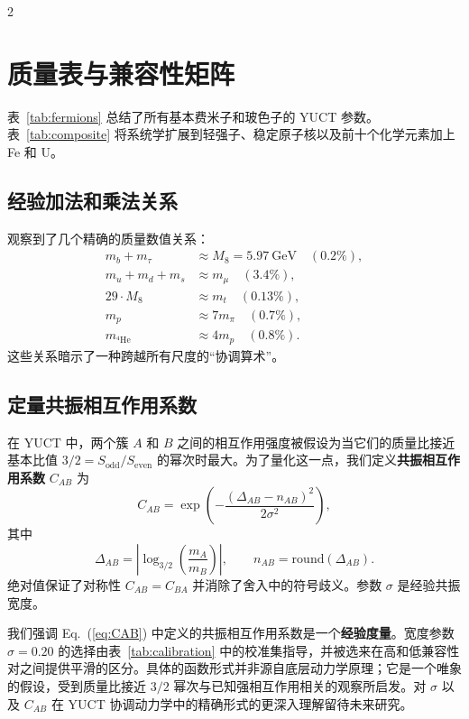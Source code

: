 \documentclass[11pt,a4paper]{article}
\begin{document}
	\begin{multicols}{2}
		
		\section{质量表与兼容性矩阵}
		\label{sec:tables}
		
		表~\ref{tab:fermions} 总结了所有基本费米子和玻色子的 YUCT 参数。表~\ref{tab:composite} 将系统学扩展到轻强子、稳定原子核以及前十个化学元素加上 Fe 和 U。
		
		\subsection{经验加法和乘法关系}
		
		观察到了几个精确的质量数值关系：
		\begin{align*}
			m_b + m_\tau &\approx M_8 = 5.97\ \text{GeV} \quad (0.2\%),\\
			m_u + m_d + m_s &\approx m_\mu \quad (3.4\%),\\
			29 \cdot M_8 &\approx m_t \quad (0.13\%),\\
			m_p &\approx 7 m_\pi \quad (0.7\%),\\
			m_{^4\mathrm{He}} &\approx 4 m_p \quad (0.8\%).
		\end{align*}
		这些关系暗示了一种跨越所有尺度的“协调算术”。
		
		\subsection{定量共振相互作用系数}
		
		在 YUCT 中，两个簇 \(A\) 和 \(B\) 之间的相互作用强度被假设为当它们的质量比接近基本比值 \(3/2 = S_{\mathrm{odd}}/S_{\mathrm{even}}\) 的幂次时最大。为了量化这一点，我们定义\textbf{共振相互作用系数} \(C_{AB}\) 为
		\begin{equation}
			C_{AB} = \exp\left( - \frac{(\Delta_{AB} - n_{AB})^2}{2\sigma^2} \right),
			\label{eq:CAB}
		\end{equation}
		其中
		\[
		\Delta_{AB} = \left| \log_{3/2}\left( \frac{m_A}{m_B} \right) \right|, \qquad n_{AB} = \text{round}(\Delta_{AB}).
		\]
		绝对值保证了对称性 \(C_{AB}=C_{BA}\) 并消除了舍入中的符号歧义。参数 \(\sigma\) 是经验共振宽度。
		
		我们强调 Eq.~(\ref{eq:CAB}) 中定义的共振相互作用系数是一个\textbf{经验度量}。宽度参数 \(\sigma = 0.20\) 的选择由表~\ref{tab:calibration} 中的校准集指导，并被选来在高和低兼容性对之间提供平滑的区分。具体的函数形式并非源自底层动力学原理；它是一个唯象的假设，受到质量比接近 \(3/2\) 幂次与已知强相互作用相关的观察所启发。对 \(\sigma\) 以及 \(C_{AB}\) 在 YUCT 协调动力学中的精确形式的更深入理解留待未来研究。
		

\end{multicols}
\end{document}
